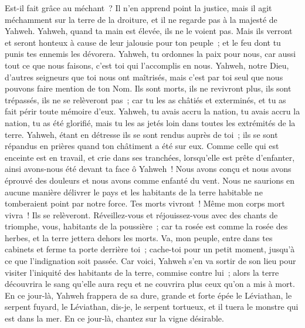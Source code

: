 \begin{multicols}{2}
Est-il fait grâce au méchant~? Il n'en apprend point la justice, mais il agit méchamment sur la terre de la droiture, et il ne regarde pas à la majesté de Yahweh.
Yahweh, quand ta main est élevée, ils ne le voient pas. Mais ils verront et seront honteux à cause de leur jalousie pour ton peuple~; et le feu dont tu punis tes ennemis les dévorera.
Yahweh, tu ordonnes la paix pour nous, car aussi tout ce que nous faisons, c'est toi qui l'accomplis en nous.
Yahweh, notre Dieu, d'autres seigneurs que toi nous ont maîtrisés, mais c'est par toi seul que nous pouvons faire mention de ton Nom.
Ils sont morts, ils ne revivront plus, ils sont trépassés, ils ne se relèveront pas~; car tu les as châtiés et exterminés, et tu as fait périr toute mémoire d'eux.
Yahweh, tu avais accru la nation, tu avais accru la nation, tu as été glorifié, mais tu les as jetés loin dans toutes les extrémités de la terre.
Yahweh, étant en détresse ils se sont rendus auprès de toi~; ils se sont répandus en prières quand ton châtiment a été sur eux.
Comme celle qui est enceinte est en travail, et crie dans ses tranchées, lorsqu'elle est prête d'enfanter, ainsi avons-nous été devant ta face ô Yahweh~!
Nous avons conçu et nous avons éprouvé des douleurs et nous avons comme enfanté du vent. Nous ne saurions en aucune manière délivrer le pays et les habitants de la terre habitable ne tomberaient point par notre force.
Tes morts vivront~! Même mon corps mort vivra~! Ils se relèveront. Réveillez-vous et réjouissez-vous avec des chants de triomphe, vous, habitants de la poussière~; car ta rosée est comme la rosée des herbes, et la terre jettera dehors les morts.
Va, mon peuple, entre dans tes cabinets et ferme ta porte derrière toi~; cache-toi pour un petit moment, jusqu'à ce que l'indignation soit passée.
Car voici, Yahweh s'en va sortir de son lieu pour visiter l'iniquité des habitants de la terre, commise contre lui~; alors la terre découvrira le sang qu'elle aura reçu et ne couvrira plus ceux qu'on a mis à mort.
\VerseOne{}En ce jour-là, Yahweh frappera de sa dure, grande et forte épée le Léviathan, le serpent fuyard, le Léviathan, dis-je, le serpent tortueux, et il tuera le monstre qui est dans la mer.
En ce jour-là, chantez sur la vigne désirable.

\end{multicols}
